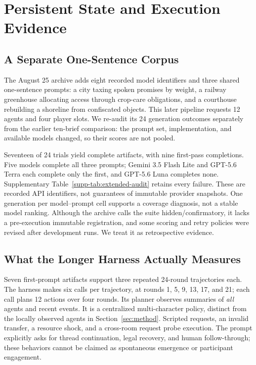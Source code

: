 \section{Persistent State and Execution Evidence}
\label{sec:extended}

\subsection{A Separate One-Sentence Corpus}
The August 25 archive adds eight recorded model identifiers and three shared
one-sentence prompts: a city taxing spoken promises by weight, a railway
greenhouse allocating access through crop-care obligations, and a courthouse
rebuilding a shoreline from confiscated objects. This later pipeline requests
12 agents and four player slots. We re-audit its 24 generation outcomes
separately from the earlier ten-brief comparison: the prompt set, implementation,
and available models changed, so their scores are not pooled.

Seventeen of 24 trials yield complete artifacts, with nine first-pass
completions. Five models complete all three prompts; Gemini 3.5 Flash Lite
and GPT-5.6 Terra each complete only the first, and GPT-5.6 Luna completes none.
Supplementary Table~\ref{supp-tab:extended-audit} retains every failure. These are recorded API
identifiers, not guarantees of immutable provider snapshots. One generation
per model--prompt cell supports a coverage diagnosis, not a stable model ranking.
Although the archive calls the suite hidden/confirmatory, it lacks a
pre-execution immutable registration, and some scoring and retry policies
were revised after development runs. We treat it as retrospective evidence.

\subsection{What the Longer Harness Actually Measures}
Seven first-prompt artifacts support three repeated 24-round trajectories
each. The harness makes six calls per trajectory, at rounds 1, 5, 9, 13, 17,
and 21; each call plans 12 actions over four rounds. Its planner observes
summaries of \emph{all} agents and recent events. It is a centralized
multi-character policy, distinct from the locally observed agents in
Section~\ref{sec:method}. Scripted requests, an invalid transfer, a resource
shock, and a cross-room request probe execution. The prompt explicitly asks
for thread continuation, legal recovery, and human follow-through; these
behaviors cannot be claimed as spontaneous emergence or participant engagement.

